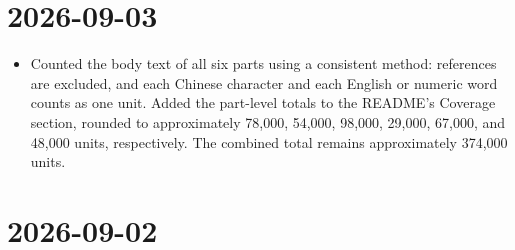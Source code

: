 \hypertarget{section-1}{%
\section{2026-09-03}\label{section-1}}

\begin{itemize}
\tightlist
\item
  Counted the body text of all six parts using a consistent method: references are excluded, and each Chinese character and each English or numeric word counts as one unit. Added the part-level totals to the README's Coverage section, rounded to approximately 78,000, 54,000, 98,000, 29,000, 67,000, and 48,000 units, respectively. The combined total remains approximately 374,000 units.
\end{itemize}

\hypertarget{section-2}{%
\section{2026-09-02}\label{section-2}}


